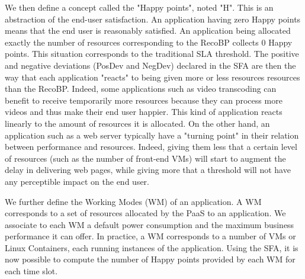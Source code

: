 We then define a concept called the "Happy points", noted "H".
This is an abstraction of the end-user satisfaction.
An application having zero Happy points means that the end user is reasonably satisfied.
An application being allocated exactly the number of resources corresponding to the RecoBP collects 0 Happy points.
This situation corresponds to the traditional SLA threshold.
The positive and negative deviations (PosDev and NegDev) declared in the SFA are then the way that each application "reacts" to being given more or less resources resources than the RecoBP.
Indeed, some applications such as video transcoding can benefit to receive temporarily more resources because they can process more videos and thus make their end user happier. 
This kind of application reacts linearly to the amount of resources it is allocated.
On the other hand, an application such as a web server typically have a "turning point" in their relation between performance and resources.
Indeed, giving them less that a certain level of resources (such as the number of front-end VMs) will start to augment the delay in delivering web pages, while giving more that a threshold will not have any perceptible impact on the end user.

We further define the Working Modes (WM) of an application.
A WM corresponds to a set of resources allocated by the PaaS to an application.
We associate to each WM a default power consumption and the maximum business performance it can offer.
In practice, a WM corresponds to a number of VMs or Linux Containers, each running instances of the application.
Using the SFA, it is now possible to compute the number of Happy points provided by each WM for each time slot.











